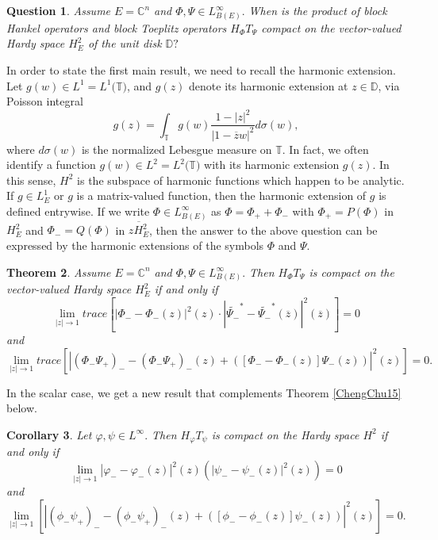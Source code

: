 \documentclass{article}%
\newtheorem{theorem}{Theorem}[section]
\newtheorem{corollary}[theorem]{Corollary}
\newtheorem{question}[theorem]{Question}
\begin{document}
\begin{question}
Assume $E=\mathbb{C}^{n}$ and $\Phi,\Psi\in L_{B(E)}^{\infty}.$ When is the
product of block Hankel operators and block Toeplitz operators $H_{\Phi
}T_{\Psi}$ compact on the vector-valued Hardy space $H_{E}^{2}$ of the unit
disk $\mathbb{D}?$
\end{question}

In order to state the first main result, we need to recall the harmonic
extension. Let $g(w)\in L^{1}=L^{1}(\mathbb{T)}$, and $g(z)$ denote its
harmonic extension at $z\in\mathbb{D}$, via Poisson integral%
\[
g(z)=\int_{\mathbb{T}}g(w)\frac{1-\left\vert z\right\vert ^{2}}{\left\vert
1-\overline{z}w\right\vert ^{2}}d\sigma(w),
\]
where $d\sigma(w)$ is the normalized Lebesgue measure on $\mathbb{T}$. In
fact, we often identify a function $g(w)\in L^{2}=L^{2}(\mathbb{T)}$ with its
harmonic extension $g(z).$ In this sense, $H^{2}$ is the subspace of harmonic
functions which happen to be analytic. If $g\in L_{E}^{1}$ or $g$ is a
matrix-valued function, then the harmonic extension of $g$ is defined
entrywise. If we write $\Phi\in L_{B(E)}^{\infty}$ as $\Phi=\Phi_{+}+\Phi_{-}$
with $\Phi_{+}=P(\Phi)$ in $H_{E}^{2}$ and $\Phi_{-}=Q(\Phi)$ in $\overline{zH_{E}^{2}}$, then
the answer to the above question can be expressed by the harmonic extensions
of the symbols $\Phi$ and $\Psi$.

\begin{theorem}
\label{thm harmonic extension} Assume $E=\mathbb{C}^{n}$ and $\Phi,\Psi\in
L_{B(E)}^{\infty}.$ Then $H_{\Phi}T_{\Psi}$ is compact on the vector-valued
Hardy space $H_{E}^{2}$ if and only if%
\[
\lim_{\left\vert z\right\vert \rightarrow1}trace\left[  \left\vert \Phi
_{-}-\Phi_{-}(z)\right\vert ^{2}(z)\cdot\left\vert \widetilde{\Psi_{-}}^{\ast
}-\widetilde{\Psi_{-}}^{\ast}(\overline{z})\right\vert ^{2}(\overline
{z})\right]  =0
\]
and
\[
\lim_{\left\vert z\right\vert \rightarrow1}trace\left[  \left\vert \left(
\Phi_{-}\Psi_{+}\right)  _{-}-\left(  \Phi_{-}\Psi_{+}\right)  _{-}(z)+\left(
\left[  \Phi_{-}-\Phi_{-}(z)\right]  \Psi_{-}(z)\right)  \right\vert
^{2}(z)\right]  =0.
\]

\end{theorem}

In the scalar case, we get a new result that complements Theorem
\ref{ChengChu15} below.

\begin{corollary}
Let $\varphi,\psi\in L^{\infty}.$ Then $H_{\varphi}T_{\psi}$ is compact on the
Hardy space $H^{2}$ if and only if%
\[
\lim_{\left\vert z\right\vert \rightarrow1}\left\vert \varphi_{-}-\varphi
_{-}(z)\right\vert ^{2}(z)\left(  \left\vert \psi_{-}-\psi_{-}(z)\right\vert
^{2}(z)\right)  =0
\]
and
\[
\lim_{\left\vert z\right\vert \rightarrow1}\left[  \left\vert \left(  \phi
_{-}\psi_{+}\right)  _{-}-\left(  \phi_{-}\psi_{+}\right)  _{-}(z)+\left(
\left[  \phi_{-}-\phi_{-}(z)\right]  \psi_{-}(z)\right)  \right\vert ^{2}(z)
\right]  =0.
\]

\end{corollary}
\end{document}
